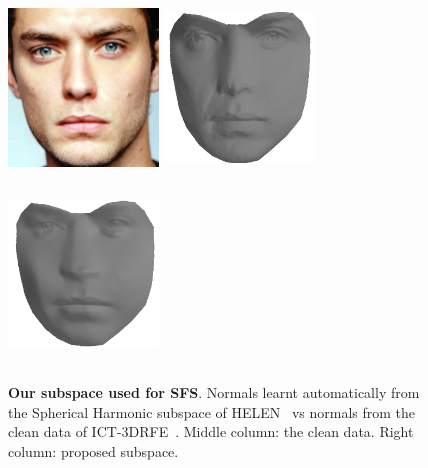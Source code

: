 \begin{figure}[t]
    \includegraphics[width=4cm,height=4.8cm]{collection_ps/images/smith/jude_law}                          \hspace{0.3cm}
    \includegraphics[width=4cm,height=4.8cm]{collection_ps/images/smith/law_smith_frontal_ict}             \hspace{0.3cm}
    \includegraphics[width=4cm,height=4.8cm]{collection_ps/images/smith/law_smith_frontal_low_rank}
    \caption{{\bf Our subspace used for SFS}. Normals learnt automatically from
             the Spherical Harmonic subspace of HELEN~\cite{le2012interactive} vs
             normals from the clean data of ICT-3DRFE~\cite{stratou2012exploring}.
             Middle column: the clean data.
             Right column: proposed subspace.}
\label{fig:imag_coll_smith}
\end{figure}
